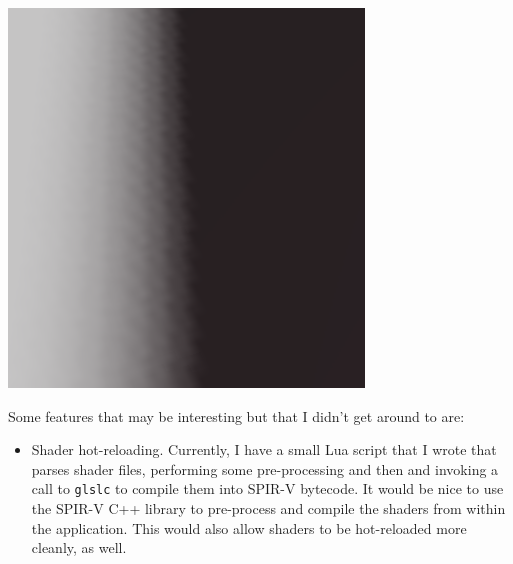 \documentclass[8pt]{article}
\newenvironment{Figure}
  {\par\medskip\noindent\minipage{\linewidth}}
  {\endminipage\par\medskip}
\begin{document}
\begin{multicols}{2}
			\begin{Figure}
				\centering
				\includegraphics[width=\linewidth]{media/shadow.png}
				\label{fig:shadow}
			\end{Figure}

			Some features that may be interesting but that I didn't get around
			to are:
				\begin{itemize}
					\item Shader hot-reloading. Currently, I have a small Lua
						script that I wrote that parses shader files, performing
						some pre-processing and then and invoking a call to
						\texttt{glslc} to compile them into SPIR-V bytecode.
						It would be nice to use the SPIR-V C++ library to
						pre-process and compile the shaders from within the
						application. This would also allow shaders to be
						hot-reloaded more cleanly, as well.
				\end{itemize}
		\end{multicols}
\end{document}
